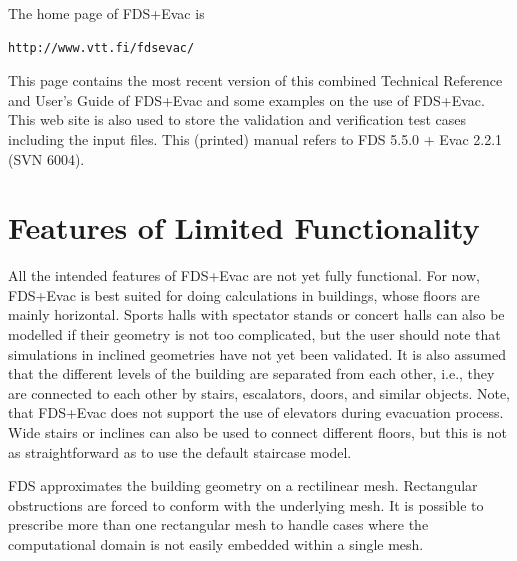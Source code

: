 \documentclass[12pt,a4paper,final,twoside]{stylevk}
\begin{document}
The home page of FDS+Evac is 
\begin{verbatim}
http://www.vtt.fi/fdsevac/
\end{verbatim}
This page contains the most recent version of this combined Technical
Reference and User's Guide of FDS+Evac and some examples on the use of
FDS+Evac.  This web site is also used to store the validation and
verification test cases including the input files.  This (printed)
manual refers to FDS 5.5.0 + Evac 2.2.1 (SVN 6004).


\section{Features of Limited Functionality}\label{Sec_SpecFeatures}

\noindent All the intended features of FDS+Evac are not yet fully
functional.  For now, FDS+Evac is best suited for doing calculations
in buildings, whose floors are mainly horizontal.  Sports halls with
spectator stands or concert halls can also be modelled if their
geometry is not too complicated, but the user should note that
simulations in inclined geometries have not yet been validated.  It is
also assumed that the different levels of the building are separated
from each other, i.e., they are connected to each other by
stairs, escalators, doors, and similar objects.  Note, that FDS+Evac
does not support the use of elevators during evacuation process.  Wide
stairs or inclines can also be used to connect different floors, but
this is not as straightforward as to use the default staircase model.


FDS approximates the building geometry on a rectilinear mesh.
Rectangular obstructions are forced to conform with the underlying
mesh.  It is possible to prescribe more than one rectangular mesh to
handle cases where the computational domain is not easily embedded
within a single mesh. 
\end{document}
